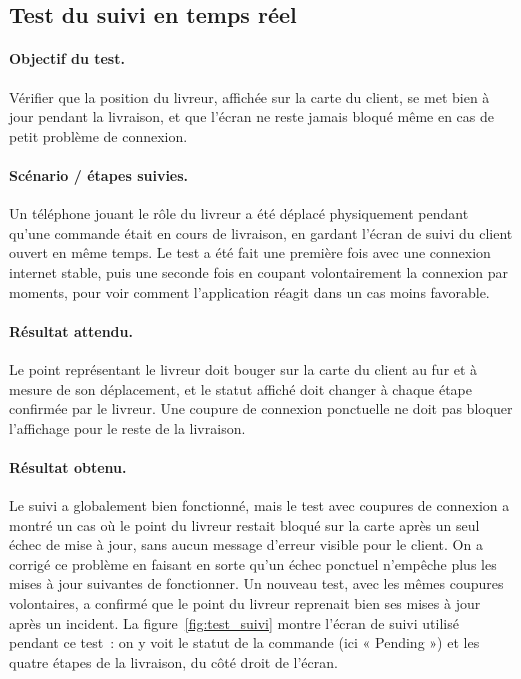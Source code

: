 \documentclass[12pt,fleqn,a4paper]{report}
\begin{document}
\begin{justify}
\subsection{Test du suivi en temps réel}

\paragraph{Objectif du test.}
Vérifier que la position du livreur, affichée sur la carte du client, se met bien à jour pendant la livraison, et que l'écran ne reste jamais bloqué même en cas de petit problème de connexion.

\paragraph{Scénario / étapes suivies.}
Un téléphone jouant le rôle du livreur a été déplacé physiquement pendant qu'une commande était en cours de livraison, en gardant l'écran de suivi du client ouvert en même temps. Le test a été fait une première fois avec une connexion internet stable, puis une seconde fois en coupant volontairement la connexion par moments, pour voir comment l'application réagit dans un cas moins favorable.

\paragraph{Résultat attendu.}
Le point représentant le livreur doit bouger sur la carte du client au fur et à mesure de son déplacement, et le statut affiché doit changer à chaque étape confirmée par le livreur. Une coupure de connexion ponctuelle ne doit pas bloquer l'affichage pour le reste de la livraison.

\paragraph{Résultat obtenu.}
Le suivi a globalement bien fonctionné, mais le test avec coupures de connexion a montré un cas où le point du livreur restait bloqué sur la carte après un seul échec de mise à jour, sans aucun message d'erreur visible pour le client. On a corrigé ce problème en faisant en sorte qu'un échec ponctuel n'empêche plus les mises à jour suivantes de fonctionner. Un nouveau test, avec les mêmes coupures volontaires, a confirmé que le point du livreur reprenait bien ses mises à jour après un incident. La figure~\ref{fig:test_suivi} montre l'écran de suivi utilisé pendant ce test~: on y voit le statut de la commande (ici « Pending ») et les quatre étapes de la livraison, du côté droit de l'écran.


\end{justify}
\end{document}
